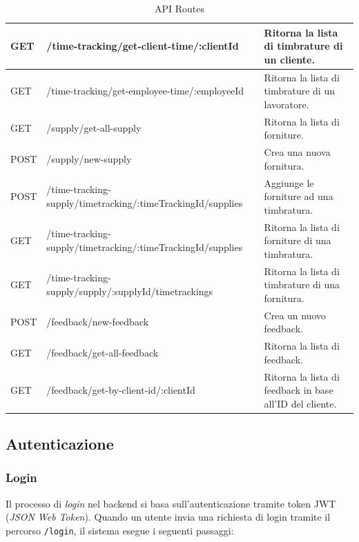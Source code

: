 \documentclass[twoside]{supsistudent}
\begin{document}
\begin{table}[ht]
{\begin{tabular}{|l|l|l|}
      GET                  & /time-tracking/get-client-time/:clientId                    & Ritorna la lista di timbrature di un cliente.            \\ \hline
      GET                  & /time-tracking/get-employee-time/:employeeId                & Ritorna la lista di timbrature di un lavoratore.         \\ \hline
      GET                  & /supply/get-all-supply                                      & Ritorna la lista di forniture.                           \\ \hline
      POST                 & /supply/new-supply                                          & Crea una nuova fornitura.                                \\ \hline
      POST                 & /time-tracking-supply/timetracking/:timeTrackingId/supplies & Aggiunge le forniture ad una timbratura.                 \\ \hline
      GET                  & /time-tracking-supply/timetracking/:timeTrackingId/supplies & Ritorna la lista di forniture di una timbratura.         \\ \hline
      GET                  & /time-tracking-supply/supply/:supplyId/timetrackings        & Ritorna la lista di timbrature di una fornitura.         \\ \hline
      POST                 & /feedback/new-feedback                                      & Crea un nuovo feedback.                                  \\ \hline
      GET                  & /feedback/get-all-feedback                                  & Ritorna la lista di feedback.                            \\ \hline
      GET                  & /feedback/get-by-client-id/:clientId                        & Ritorna la lista di feedback in base all'ID del cliente. \\ \hline
    \end{tabular}
  }
  \caption{API Routes}
  \label{tab:api_routes}
\end{table}


\subsection{Autenticazione}
\subsubsection{Login}

Il processo di \textit{login} nel backend si basa sull'autenticazione tramite token JWT (\textit{JSON Web Token}). Quando un utente invia una richiesta di login tramite il percorso \texttt{/login}, il sistema esegue i seguenti passaggi:
\end{document}

